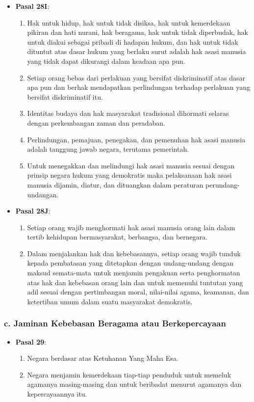 \begin{itemize}
\begin{enumerate}
    \end{enumerate}
    \item \textbf{Pasal 28I}:
    \begin{enumerate}
        \item Hak untuk hidup, hak untuk tidak disiksa, hak untuk kemerdekaan pikiran dan hati nurani, hak beragama, hak untuk tidak diperbudak, hak untuk diakui sebagai pribadi di hadapan hukum, dan hak untuk tidak dituntut atas dasar hukum yang berlaku surut adalah hak asasi manusia yang tidak dapat dikurangi dalam keadaan apa pun.
        \item Setiap orang bebas dari perlakuan yang bersifat diskriminatif atas dasar apa pun dan berhak mendapatkan perlindungan terhadap perlakuan yang bersifat diskriminatif itu.
        \item Identitas budaya dan hak masyarakat tradisional dihormati selaras dengan perkembangan zaman dan peradaban.
        \item Perlindungan, pemajuan, penegakan, dan pemenuhan hak asasi manusia adalah tanggung jawab negara, terutama pemerintah.
        \item Untuk menegakkan dan melindungi hak asasi manusia sesuai dengan prinsip negara hukum yang demokratis maka pelaksanaan hak asasi manusia dijamin, diatur, dan dituangkan dalam peraturan perundang-undangan.
    \end{enumerate}
    \item \textbf{Pasal 28J}:
    \begin{enumerate}
        \item Setiap orang wajib menghormati hak asasi manusia orang lain dalam tertib kehidupan bermasyarakat, berbangsa, dan bernegara.
        \item Dalam menjalankan hak dan kebebasannya, setiap orang wajib tunduk kepada pembatasan yang ditetapkan dengan undang-undang dengan maksud semata-mata untuk menjamin pengakuan serta penghormatan atas hak dan kebebasan orang lain dan untuk memenuhi tuntutan yang adil sesuai dengan pertimbangan moral, nilai-nilai agama, keamanan, dan ketertiban umum dalam suatu masyarakat demokratis.
    \end{enumerate}
\end{itemize}

\subsubsection{c. Jaminan Kebebasan Beragama atau Berkepercayaan}
\begin{itemize}
    \item \textbf{Pasal 29}:
    \begin{enumerate}
        \item Negara berdasar atas Ketuhanan Yang Maha Esa.
        \item Negara menjamin kemerdekaan tiap-tiap penduduk untuk memeluk agamanya masing-masing dan untuk beribadat menurut agamanya dan kepercayaannya itu.
    \end{enumerate}
\end{itemize}

